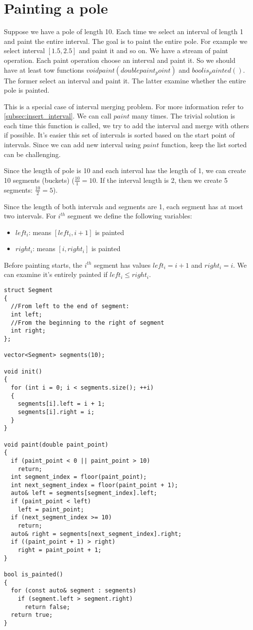 \documentclass{book}
\begin{document}
	\section{Painting a pole}
	\label{sec:painting_a_pole}
	Suppose we have a pole of length 10. Each time we select an interval of length 1 and paint the entire interval. The goal is to paint the entire pole. For example we select interval $[1.5, 2.5]$ and paint it and so on. We have a stream of paint operation. Each paint operation choose an interval and paint it. So we should have at least tow functions $void paint(double paint_point)$ and $bool is_painted()$. The former select an interval and paint it. The latter examine whether the entire pole is painted.
	\par This is a special case of interval merging problem. For more information refer to \ref{subsec:insert_interval}. We can call $paint$ many times. The trivial solution is each time this function is called, we try to add the interval and merge with others if possible. It's easier this set of intervals is sorted based on the start point of intervals. Since we can add new interval using $paint$ function, keep the list sorted can be challenging.
	\par Since the length of pole is 10 and each interval has the length of 1, we can create 10 segments (buckets) ($\frac{10}{1} = 10$. If the interval length is 2, then we create 5 segments: $\frac{10}{2} = 5$).
	\par Since the length of both intervals and segments are 1, each segment has at most two intervals. For $i^{th}$ segment we define the following variables:
	\begin{itemize}
		\item $left_i$: means $[left_i, i + 1]$ is painted
		\item $right_i$: means $[i, right_i]$ is painted
	\end{itemize}
	Before painting starts, the $i^{th}$ segment has values $left_i = i + 1$ and $right_i = i$. We can examine it's entirely painted if $left_i \le right_i$.
	\begin{lstlisting}
struct Segment
{
  //From left to the end of segment:
  int left;
  //From the beginning to the right of segment
  int right;
};

vector<Segment> segments(10);

void init()
{
  for (int i = 0; i < segments.size(); ++i)
  {
    segments[i].left = i + 1;
    segments[i].right = i;
  }
}

void paint(double paint_point)
{
  if (paint_point < 0 || paint_point > 10)
    return;
  int segment_index = floor(paint_point);
  int next_segment_index = floor(paint_point + 1);
  auto& left = segments[segment_index].left;
  if (paint_point < left)
    left = paint_point;
  if (next_segment_index >= 10)
    return;
  auto& right = segments[next_segment_index].right;
  if ((paint_point + 1) > right)
    right = paint_point + 1;
}

bool is_painted()
{
  for (const auto& segment : segments)
    if (segment.left > segment.right)
      return false;
  return true;
}
	\end{lstlisting}
\end{document}
